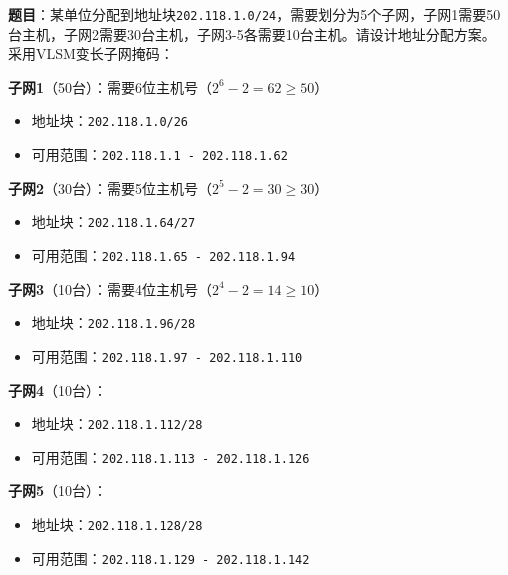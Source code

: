 \begin{examplebox}[例题4.8 子网划分综合]
\textbf{题目}：某单位分配到地址块\texttt{202.118.1.0/24}，需要划分为5个子网，子网1需要50台主机，子网2需要30台主机，子网3-5各需要10台主机。请设计地址分配方案。
\tcblower
采用VLSM变长子网掩码：

\textbf{子网1}（50台）：需要6位主机号（$2^6-2=62\geq50$）
\begin{itemize}[itemsep=0pt]
    \item 地址块：\texttt{202.118.1.0/26}
    \item 可用范围：\texttt{202.118.1.1 - 202.118.1.62}
\end{itemize}

\textbf{子网2}（30台）：需要5位主机号（$2^5-2=30\geq30$）
\begin{itemize}[itemsep=0pt]
    \item 地址块：\texttt{202.118.1.64/27}
    \item 可用范围：\texttt{202.118.1.65 - 202.118.1.94}
\end{itemize}

\textbf{子网3}（10台）：需要4位主机号（$2^4-2=14\geq10$）
\begin{itemize}[itemsep=0pt]
    \item 地址块：\texttt{202.118.1.96/28}
    \item 可用范围：\texttt{202.118.1.97 - 202.118.1.110}
\end{itemize}

\textbf{子网4}（10台）：
\begin{itemize}[itemsep=0pt]
    \item 地址块：\texttt{202.118.1.112/28}
    \item 可用范围：\texttt{202.118.1.113 - 202.118.1.126}
\end{itemize}

\textbf{子网5}（10台）：
\begin{itemize}[itemsep=0pt]
    \item 地址块：\texttt{202.118.1.128/28}
    \item 可用范围：\texttt{202.118.1.129 - 202.118.1.142}
\end{itemize}
\end{examplebox}


